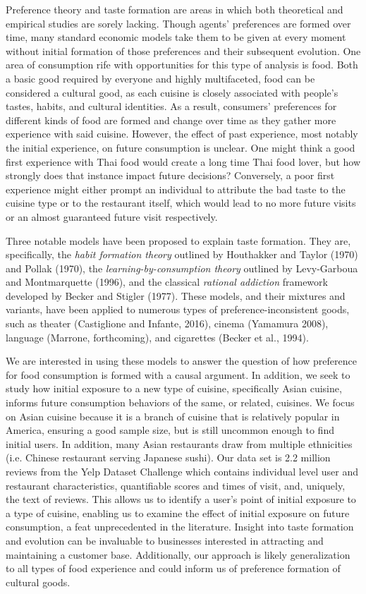 \documentclass[Journal,letterpaper, NoLineNumbers]{ascelike-new}
\begin{document}
Preference theory and taste formation are areas in which both theoretical and empirical studies are sorely lacking. Though agents' preferences are formed over time, many standard economic models take them to be given at every moment without initial formation of those preferences and their subsequent evolution. One area of consumption rife with opportunities for this type of analysis is food. Both a basic good required by everyone and highly multifaceted, food can be considered a cultural good, as each cuisine is closely associated with people's tastes, habits, and cultural identities. As a result, consumers' preferences for different kinds of food are formed and change over time as they gather more experience with said cuisine. However, the effect of past experience, most notably the initial experience, on future consumption is unclear. One might think a good first experience with Thai food would create a long time Thai food lover, but how strongly does that instance impact future decisions? Conversely, a poor first experience might either prompt an individual to attribute the bad taste to the cuisine type or to the restaurant itself, which would lead to no more future visits or an almost guaranteed future visit respectively. 

Three notable models have been proposed to explain taste formation. They are, specifically, the \textit{habit formation theory} outlined by Houthakker and Taylor (1970) and Pollak (1970), the \textit{learning-by-consumption theory} outlined by Levy-Garboua and Montmarquette (1996), and the classical \textit{rational addiction} framework developed by Becker and Stigler (1977). These models, and their mixtures and variants, have been applied to numerous types of preference-inconsistent goods, such as theater (Castiglione and Infante, 2016), cinema (Yamamura 2008), language (Marrone, forthcoming), and cigarettes (Becker et al., 1994).

We are interested in using these models to answer the question of how preference for food consumption is formed with a causal argument. In addition, we seek to study how initial exposure to a new type of cuisine, specifically Asian cuisine, informs future consumption behaviors of the same, or related, cuisines. We focus on Asian cuisine because it is a branch of cuisine that is relatively popular in America, ensuring a good sample size, but is still uncommon enough to find initial users. In addition, many Asian restaurants draw from multiple ethnicities (i.e. Chinese restaurant serving Japanese sushi). Our data set is 2.2 million reviews from the Yelp Dataset Challenge which contains individual level  user and restaurant characteristics, quantifiable scores and times of visit, and, uniquely, the text of reviews. This allows us to identify a user's point of initial exposure to a type of cuisine, enabling us to examine the effect of initial exposure on future consumption, a feat unprecedented in the literature. Insight into taste formation and evolution can be invaluable to businesses interested in attracting and maintaining a customer base. Additionally, our approach is likely generalization to all types of food experience and could inform us of preference formation of cultural goods. 
\end{document}
